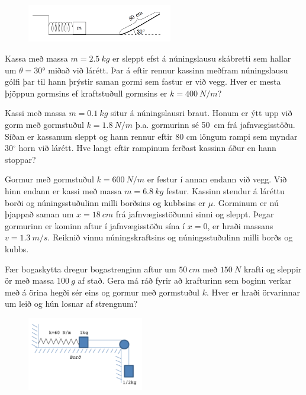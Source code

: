 \ifdefined \wholebook \else\documentclass[oneside]{book}\usepackage{EdlBook}\graphicspath{{figures/}}
\begin{document}
\begin{enumerate}[label = \textbf{Dæmi \thechapter.\arabic*.}]
\begin{minipage}{\linewidth}
\begin{figure}
\vspace{-0.5cm}
\includegraphics[width=2.5in]{images/rampurmerking.png}
\end{figure}

\item Kassa með massa $m = \SI{2.5}{kg}$ er sleppt efst á núningslausu skábretti sem hallar um $\theta = \ang{30}$ miðað við lárétt. Þar á eftir rennur kassinn meðfram núningslausu gólfi þar til hann þrýstir saman gormi sem fastur er við vegg. Hver er mesta þjöppun gormsins ef kraftstuðull gormsins er $k = \SI{400}{N/m}$?

\end{minipage}

\item Kassi með massa $m=\SI{0,1}{kg}$ situr á núningslausri braut. Honum er ýtt upp við gorm með gormstuðul $k=\SI{1,8}{N/m}$ þ.a. gormurinn sé \SI{50}{cm} frá jafnvægisstöðu. Síðan er kassanum sleppt og hann rennur eftir 80 cm löngum rampi sem myndar 30$^{\circ}$ horn við lárétt. Hve langt eftir rampinum ferðast kassinn áður en hann stoppar?

\item Gormur með gormstuðul $k = \SI{600}{N/m}$ er festur í annan endann við vegg. Við hinn endann er kassi með massa $m = \SI{6.8}{kg}$ festur. Kassinn stendur á láréttu borði og núningsstuðulinn milli borðsins og kubbsins er $\mu$. Gorminum er nú þjappað saman um $x = \SI{18}{cm}$ frá jafnvægisstöðunni sinni og sleppt. Þegar gormurinn er kominn aftur í jafnvægisstöðu sína í $x = 0$, er hraði massans $v = \SI{1.3}{m/s}$. Reiknið vinnu núningskraftsins og núningsstuðulinn milli borðs og kubbs.

\item Fær bogaskytta dregur bogastrenginn aftur um $\SI{50}{cm}$ með $\SI{150}{N}$ krafti og sleppir ör með massa $\SI{100}{g}$ af stað. Gera má ráð fyrir að krafturinn sem boginn verkar með á örina hegði sér eins og gormur með gormstuðul $k$. Hver er hraði örvarinnar um leið og hún losnar af strengnum?

\begin{minipage}{\linewidth}
\begin{figure}
\vspace{-0.75cm}
\includegraphics[width = 2in]{temp/burnspring.png}
\end{figure}


\end{minipage}
\end{enumerate}
\end{document}
